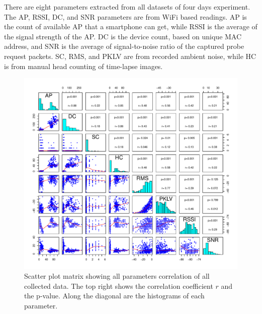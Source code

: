 	There are eight parameters extracted from all datasets of four days experiment. The \ac{AP}, \ac{RSSI}, \ac{DC}, and \ac{SNR} parameters are from WiFi based readings. \ac{AP} is the count of available \ac{AP} that a smartphone can get, while \ac{RSSI} is the average of the signal strength of the \ac{AP}. \ac{DC} is the device count, based on unique \ac{MAC} address, and \ac{SNR} is the average of signal-to-noise ratio of the captured probe request packets. \ac{SC}, \ac{RMS}, and \ac{PKLV} are from recorded ambient noise, while \ac{HC} is from manual head counting of time-lapse images.

	\begin{figure}[h]
		\begin{adjustwidth}{-3cm}{}
		\centering
		\includegraphics[width=1.3\textwidth]{./img/result/all-result}
		\end{adjustwidth}
		\caption[Scatter plot matrix of all parameters.]
		{Scatter plot matrix showing all parameters correlation of all collected data. The top right shows the correlation coefficient $r$ and the p-value. Along the diagonal are the histograms of each parameter.}
		\label{fig:scatterplot-matrix}
	\end{figure}


